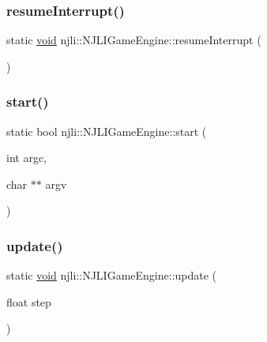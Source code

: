 \subsubsection{\texorpdfstring{resume\+Interrupt()}{resumeInterrupt()}}
{\footnotesize\ttfamily static \mbox{\hyperlink{_thread_8h_af1e856da2e658414cb2456cb6f7ebc66}{void}} njli\+::\+N\+J\+L\+I\+Game\+Engine\+::resume\+Interrupt (\begin{DoxyParamCaption}{ }\end{DoxyParamCaption})\hspace{0.3cm}{\ttfamily [static]}}

\mbox{\label{classnjli_1_1_n_j_l_i_game_engine_a9b08da977237bdf3b47bc4796c6a62e2}} 
\subsubsection{\texorpdfstring{start()}{start()}}
{\footnotesize\ttfamily static bool njli\+::\+N\+J\+L\+I\+Game\+Engine\+::start (\begin{DoxyParamCaption}\item[{int}]{argc,  }\item[{char $\ast$$\ast$}]{argv }\end{DoxyParamCaption})\hspace{0.3cm}{\ttfamily [static]}}

\mbox{\label{classnjli_1_1_n_j_l_i_game_engine_a0cc3ea87f7451156b3d2b493688bf90a}} 
\subsubsection{\texorpdfstring{update()}{update()}}
{\footnotesize\ttfamily static \mbox{\hyperlink{_thread_8h_af1e856da2e658414cb2456cb6f7ebc66}{void}} njli\+::\+N\+J\+L\+I\+Game\+Engine\+::update (\begin{DoxyParamCaption}\item[{float}]{step }\end{DoxyParamCaption})\hspace{0.3cm}{\ttfamily [static]}}

